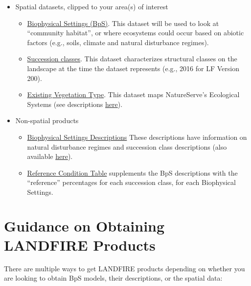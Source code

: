 \documentclass[
]{book}
\providecommand{\tightlist}{%
  \setlength{\itemsep}{0pt}\setlength{\parskip}{0pt}}
\begin{document}
\begin{itemize}
\tightlist
\item
  Spatial datasets, clipped to your area(s) of interest

  \begin{itemize}
  \tightlist
  \item
    \href{https://www.landfire.gov/bps.php}{Biophysical Settings (BpS)}. This dataset will be used to look at ``community habitat'', or where ecosystems could occur based on abiotic factors (e.g., soils, climate and natural disturbance regimes).
  \item
    \href{https://www.landfire.gov/sclass.php}{Succession classes}. This dataset characterizes structural classes on the landscape at the time the dataset represents (e.g., 2016 for LF Version 200).
  \item
    \href{https://www.landfire.gov/evt.php}{Existing Vegetation Type}. This dataset maps NatureServe's Ecological Systems (see descriptions \href{https://www.landfire.gov/documents/LANDFIRE_Ecological_Systems_Descriptions_CONUS.pdf}{here}).
  \end{itemize}
\item
  Non-spatial products

  \begin{itemize}
  \tightlist
  \item
    \href{http://landfirereview.org/test/search.php}{Biophysical Settings Descriptions} These descriptions have information on natural disturbance regimes and succession class descriptions (also available \href{https://www.landfire.gov/zip/LANDFIRE_CONUS_SClass_Mapping_Rules_9182020.zip}{here}).\\
  \item
    \href{https://www.landfire.gov/zip/LANDFIRE_CONUS_Reference_Condition_Table_August_2020.zip}{Reference Condition Table} supplements the BpS descriptions with the ``reference'' percentages for each succession class, for each Biophysical Settings.
  \end{itemize}
\end{itemize}

\hypertarget{guidance-on-obtaining-landfire-products}{%
\section{Guidance on Obtaining LANDFIRE Products}\label{guidance-on-obtaining-landfire-products}}

There are multiple ways to get LANDFIRE products depending on whether you are looking to obtain BpS models, their descriptions, or the spatial data:
\end{document}
